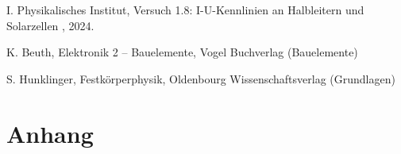 \documentclass[12pt,a4paper,ngerman]{report}
\begin{document}
	\listoffigures
	
	\begin{thebibliography}{111} 
		I. Physikalisches Institut, \glqq Versuch 1.8: I-U-Kennlinien an Halbleitern
		und Solarzellen \grqq{}, 2024.
		
		K. Beuth, \glqq Elektronik 2 – Bauelemente\grqq, Vogel Buchverlag (Bauelemente)
		
		S. Hunklinger, \glqq Festkörperphysik\grqq, Oldenbourg Wissenschaftsverlag (Grundlagen)
		
		
		
	\end{thebibliography}


\chapter*{Anhang} \label{ch:Anhang}
\FloatBarrier
\end{document}
